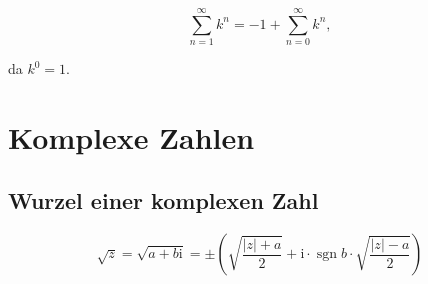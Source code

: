 \documentclass[a4paper, 16pt]{article}
\newcommand{\cmi}{\mathrm{i}}
\DeclareMathOperator{\sgn}{sgn}
\begin{document}
	\begin{equation*}
		\sum\limits_{n = 1}^{\infty}{k^n} = -1 + \sum\limits_{n = 0}^{\infty}{k^n},
	\end{equation*}

	da $k^0 = 1$.

	\section{Komplexe Zahlen}

	\subsection{Wurzel einer komplexen Zahl}

	\begin{equation*}
		\sqrt{z} = \sqrt{a + b\cmi} = \pm \left(\sqrt{\frac{|z| + a}{2}} + \cmi \cdot \sgn{b} \cdot \sqrt{\frac{|z| - a}{2}} \right)
	\end{equation*}
\end{document}
